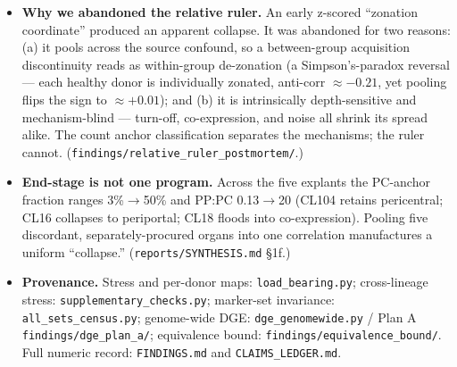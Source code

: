 \documentclass[11pt,a4paper]{article}
\begin{document}
\begin{sloppypar}
\begin{itemize}
\item \textbf{Why we abandoned the relative ruler.} An early z-scored ``zonation coordinate'' produced an apparent collapse. It was abandoned for two reasons: (a) it pools across the source confound, so a between-group acquisition discontinuity reads as within-group de-zonation (a Simpson's-paradox reversal --- each healthy donor is individually zonated, anti-corr $\approx -0.21$, yet pooling flips the sign to $\approx +0.01$); and (b) it is intrinsically depth-sensitive and mechanism-blind --- turn-off, co-expression, and noise all shrink its spread alike. The count anchor classification separates the mechanisms; the ruler cannot. (\texttt{findings/relative\_ruler\_postmortem/}.)
\item \textbf{End-stage is not one program.} Across the five explants the PC-anchor fraction ranges 3\%$\to$50\% and PP:PC 0.13$\to$20 (CL104 retains pericentral; CL16 collapses to periportal; CL18 floods into co-expression). Pooling five discordant, separately-procured organs into one correlation manufactures a uniform ``collapse.'' (\texttt{reports/SYNTHESIS.md} \S1f.)
\item \textbf{Provenance.} Stress and per-donor maps: \texttt{load\_bearing.py}; cross-lineage stress: \texttt{supplementary\_checks.py}; marker-set invariance: \texttt{all\_sets\_census.py}; genome-wide DGE: \texttt{dge\_genomewide.py} / Plan A \texttt{findings/dge\_plan\_a/}; equivalence bound: \texttt{findings/equivalence\_bound/}. Full numeric record: \texttt{FINDINGS.md} and \texttt{CLAIMS\_LEDGER.md}.
\end{itemize}
\end{sloppypar}
\end{document}

